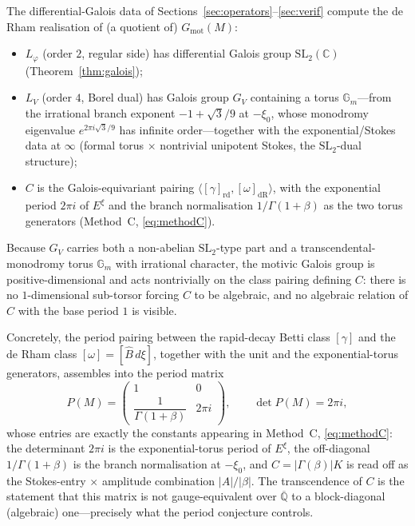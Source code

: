 \documentclass[11pt,reqno]{amsart}
\theoremstyle{plain}
\theoremstyle{definition}
\newcommand{\Bhat}{\widehat{B}}
\newcommand{\Lphi}{L_{\varphi}}
\newcommand{\LV}{L_{V}}
\newcommand{\Qbar}{\overline{\mathbb{Q}}}
\newcommand{\xizero}{\xi_0}
\newcommand{\SL}{\mathrm{SL}}
\newcommand{\Gm}{\mathbb{G}_m}
\providecommand{\C}{}\renewcommand{\C}{C}
\begin{document}
The differential-Galois data of Sections~\ref{sec:operators}--\ref{sec:verif} compute the de Rham
realisation of (a quotient of) $G_{\mathrm{mot}}(M)$:
\begin{itemize}[leftmargin=1.4em,itemsep=2pt]
  \item $\Lphi$ (order $2$, regular side) has differential Galois group $\SL_2(\mathbb{C})$
        (Theorem~\ref{thm:galois});
  \item $\LV$ (order $4$, Borel dual) has Galois group $G_V$ containing a torus $\Gm$---from the
        irrational branch exponent $-1+\sqrt3/9$ at $-\xizero$, whose monodromy eigenvalue
        $e^{2\pi i\sqrt3/9}$ has infinite order---together with the exponential/Stokes data at
        $\infty$ (formal torus $\times$ nontrivial unipotent Stokes, the $\SL_2$-dual structure);
  \item $\C$ is the Galois-equivariant pairing $\langle[\gamma]_{\mathrm{rd}},[\omega]_{\mathrm{dR}}\rangle$,
        with the exponential period $2\pi i$ of $E^{\xi}$ and the branch normalisation
        $1/\Gamma(1+\beta)$ as the two torus generators (Method~C, \eqref{eq:methodC}).
\end{itemize}
Because $G_V$ carries both a non-abelian $\SL_2$-type part and a transcendental-monodromy torus
$\Gm$ with irrational character, the motivic Galois group is positive-dimensional and acts
nontrivially on the class pairing defining $\C$: there is no $1$-dimensional sub-torsor forcing $\C$
to be algebraic, and no algebraic relation of $\C$ with the base period $1$ is visible.

Concretely, the period pairing between the rapid-decay Betti class $[\gamma]$ and the de Rham class
$[\omega]=[\Bhat\,d\xi]$, together with the unit and the exponential-torus generators, assembles
into the period matrix
\begin{equation}\label{eq:periodmatrix}
  P(M)=\begin{pmatrix} 1 & 0\\[2pt] \dfrac{1}{\Gamma(1+\beta)} & 2\pi i\end{pmatrix},
  \qquad \det P(M)=2\pi i,
\end{equation}
whose entries are exactly the constants appearing in Method~C, \eqref{eq:methodC}: the determinant
$2\pi i$ is the exponential-torus period of $E^{\xi}$, the off-diagonal $1/\Gamma(1+\beta)$ is the
branch normalisation at $-\xizero$, and $\C=\lvert\Gamma(\beta)\rvert K$ is read off as the
Stokes-entry $\times$ amplitude combination $\lvert A\rvert/\lvert\beta\rvert$. The transcendence
of $\C$ is the statement that this matrix is not gauge-equivalent over $\Qbar$ to a block-diagonal
(algebraic) one---precisely what the period conjecture controls.
\end{document}
